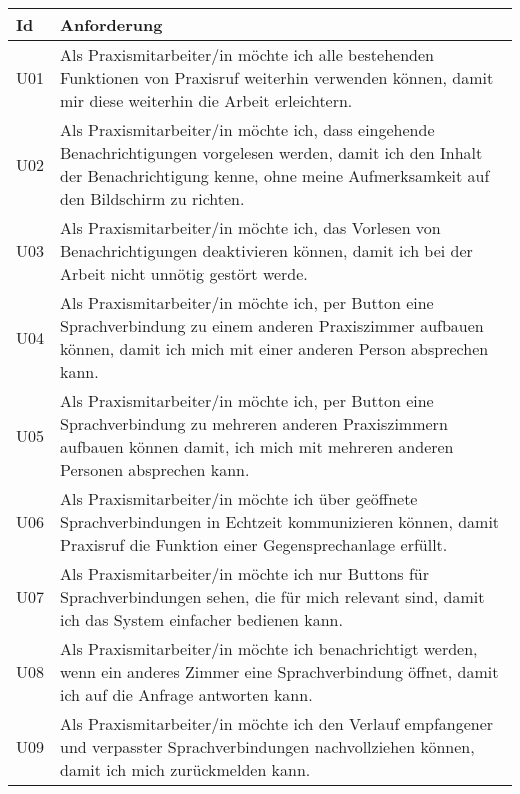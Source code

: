 \begin{table}[h]
    \centering
    \begin{tabular}{|l|p{15cm}|}
        \hline
        \textbf{Id} & \textbf{Anforderung}                                                                                                                                                                                      \\
        \hline
        U01 & Als Praxismitarbeiter/in möchte ich alle bestehenden Funktionen von Praxisruf weiterhin verwenden können, damit mir diese weiterhin die Arbeit erleichtern. \\
        \hline
        U02 & Als Praxismitarbeiter/in möchte ich, dass eingehende Benachrichtigungen vorgelesen werden, damit ich den Inhalt der Benachrichtigung kenne, ohne meine Aufmerksamkeit auf den Bildschirm zu richten. \\
        \hline
        U03 & Als Praxismitarbeiter/in möchte ich, das Vorlesen von Benachrichtigungen deaktivieren können, damit ich bei der Arbeit nicht unnötig gestört werde.                                                       \\
        \hline
        U04 & Als Praxismitarbeiter/in möchte ich, per Button eine Sprachverbindung zu einem anderen Praxiszimmer aufbauen können, damit ich mich mit einer anderen Person absprechen kann.                             \\
        \hline
        U05 & Als Praxismitarbeiter/in möchte ich, per Button eine Sprachverbindung zu mehreren anderen Praxiszimmern aufbauen können damit, ich mich mit mehreren anderen Personen absprechen kann. \\
        \hline
        U06 & Als Praxismitarbeiter/in möchte ich über geöffnete Sprachverbindungen in Echtzeit kommunizieren können, damit Praxisruf die Funktion einer Gegensprechanlage erfüllt.                 \\
        \hline
        U07 & Als Praxismitarbeiter/in möchte ich nur Buttons für Sprachverbindungen sehen, die für mich relevant sind, damit ich das System einfacher bedienen kann.                                                                          \\
        \hline
        U08 & Als Praxismitarbeiter/in möchte ich benachrichtigt werden, wenn ein anderes Zimmer eine Sprachverbindung öffnet, damit ich auf die Anfrage antworten kann.                             \\
        \hline
        U09 & Als Praxismitarbeiter/in möchte ich den Verlauf empfangener und verpasster Sprachverbindungen nachvollziehen können, damit ich mich zurückmelden kann.                                               \\

\end{tabular}
\end{table}
